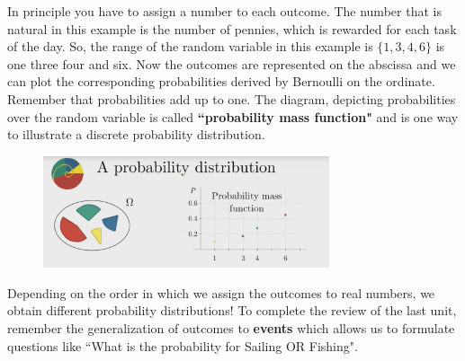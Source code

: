 \documentclass[12pt, a4paper]{scrartcl}
\begin{document}
In principle you have to assign a number to each outcome. The number that is natural in this example is the number of pennies, which is rewarded for each task of the day. 
So, the range of the random variable in this example is $\{1,3,4,6\}$  is one three four and six. %
Now the outcomes are represented on the abscissa and we can plot the corresponding probabilities derived by Bernoulli on the ordinate. Remember that probabilities add up to one.
The diagram, depicting probabilities over the random variable is called \textbf{``probability mass function"} and is one way to illustrate a discrete probability distribution.
\begin{figure}[H]
	\centering
	\includegraphics[width=0.75\textwidth]{2_2.png}
\end{figure}
Depending on the order in which we assign the outcomes to real numbers, we obtain different probability distributions!
To complete the review of the last unit, remember the generalization of outcomes to \textbf{events} which allows us to formulate questions like 
``What is the probability for Sailing OR Fishing".\\

\\
\end{document}
